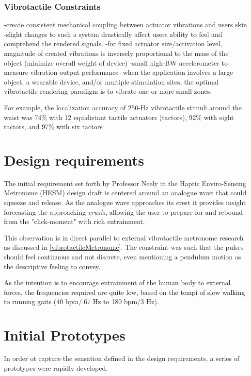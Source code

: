 \subsubsection{Vibrotactile Constraints}
-create consistent mechanical coupling between actuator vibrations and users skin
-slight changes to such a system drastically affect users ability to feel and comprehend the rendered signals.
-for fixed actuator size/activation level, magnitude of created vibrations is inversely proportional to the mass of the object (minimize overall weight of device)
-small high-BW accelerometer to measure vibration output performance
-when the application involves a large object, a wearable device, and/or multiple stimulation sites, the optimal vibrotactile rendering paradigm is to vibrate one or more small zones.

For example, the localization accuracy of 250-Hz vibrotactile stimuli around the waist was 74\% with 12 equidistant tactile actuators (tactors), 92\% with eight tactors, and 97\% with six tactors 		



\section{Design requirements}

The initial requirement set forth by Professor Neely in the Haptic Enviro-Sensing Metronome (HESM) design draft is centered around an analogue wave that could squeeze and release. As the analogue wave approaches its crest it provides insight forecasting the approaching \textit{crusis}, allowing the user to prepare for and rebound from the "click-moment" with rich entrainment. 

This observation is in direct parallel to external vibrotactile metronome research as discussed in \ref{vibrotactileMetronome}. The constraint was such that the pulses should feel continuous and not discrete, even mentioning a pendulum motion as the descriptive feeling to convey. 

As the intention is to encourage entrainment of the human body to external forces, the frequencies
required are quite low, based on the tempi of slow walking to running gaits
(40 bpm/.67 Hz to 180 bpm/3 Hz).

\cite{Neely}

\section{Initial Prototypes}
In order ot capture the sensation defined in the design requirements, a series of prototypes were rapidly developed.

